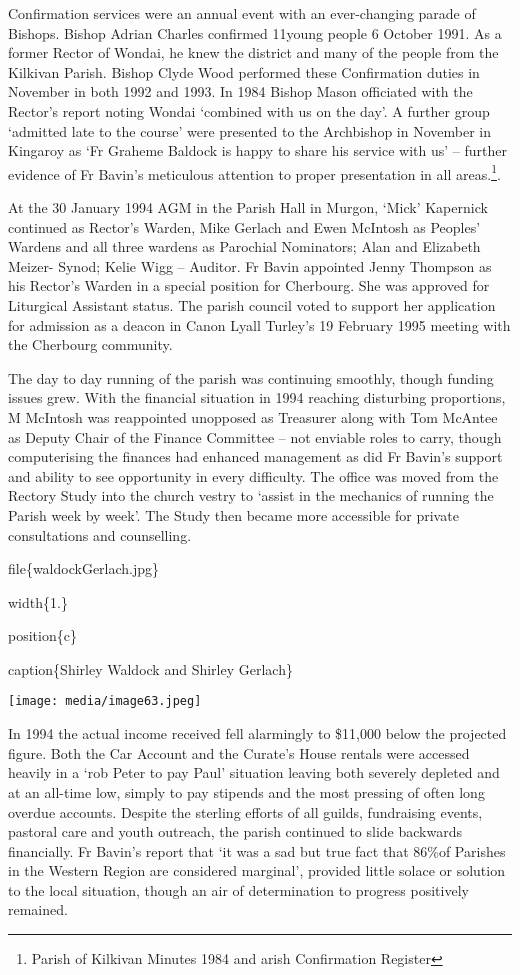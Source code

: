Confirmation services were an annual event with an ever-changing parade of Bishops. Bishop Adrian Charles confirmed 11young people 6 October 1991. As a former Rector of Wondai, he knew the district and many of the people from the Kilkivan Parish. Bishop Clyde Wood performed these Confirmation duties in November in both 1992 and 1993. In 1984 Bishop Mason officiated with the Rector's report noting Wondai `combined with us on the day'. A further group `admitted late to the course' were presented to the Archbishop in November in Kingaroy as `Fr Graheme Baldock is happy to share his service with us' -- further evidence of Fr Bavin's meticulous attention to proper presentation in all areas.\footnote{Parish of Kilkivan Minutes 1984 and arish Confirmation Register}.

At the 30 January 1994 AGM in the Parish Hall in Murgon, `Mick' Kapernick continued as Rector's Warden, Mike Gerlach and Ewen McIntosh as Peoples' Wardens and all three wardens as Parochial Nominators; Alan and Elizabeth Meizer- Synod; Kelie Wigg -- Auditor. Fr Bavin appointed Jenny Thompson as his Rector's Warden in a special position for Cherbourg. She was approved for Liturgical Assistant status. The parish council voted to support her application for admission as a deacon in Canon Lyall Turley's 19 February 1995 meeting with the Cherbourg community.

The day to day running of the parish was continuing smoothly, though funding issues grew. With the financial situation in 1994 reaching disturbing proportions, M McIntosh was reappointed unopposed as Treasurer along with Tom McAntee as Deputy Chair of the Finance Committee -- not enviable roles to carry, though computerising the finances had enhanced management as did Fr Bavin's support and ability to see opportunity in every difficulty. The office was moved from the Rectory Study into the church vestry to `assist in the mechanics of running the Parish week by week'. The Study then became more accessible for private consultations and counselling.

file\{waldockGerlach.jpg\}

width\{1.\}

position\{c\}

caption\{Shirley Waldock and Shirley Gerlach\}

\texttt{[image: media/image63.jpeg]}

In 1994 the actual income received fell alarmingly to \$11,000 below the projected figure. Both the Car Account and the Curate's House rentals were accessed heavily in a `rob Peter to pay Paul' situation leaving both severely depleted and at an all-time low, simply to pay stipends and the most pressing of often long overdue accounts. Despite the sterling efforts of all guilds, fundraising events, pastoral care and youth outreach, the parish continued to slide backwards financially. Fr Bavin's report that `it was a sad but true fact that 86\%of Parishes in the Western Region are considered marginal', provided little solace or solution to the local situation, though an air of determination to progress positively remained.

